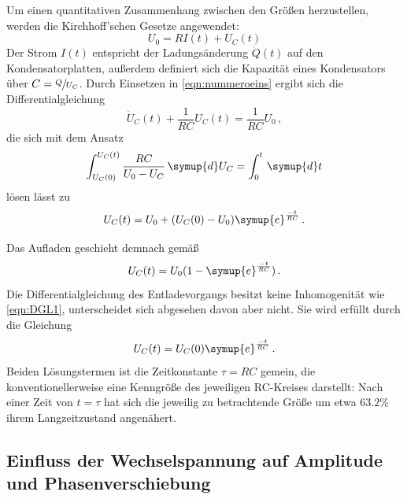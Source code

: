 Um einen quantitativen Zusammenhang zwischen den Größen herzustellen, werden die Kirchhoff'schen Gesetze angewendet: 
\begin{equation}
    U_0 = RI(t)+U_C(t)
    \label{eqn:nummeroeins}
\end{equation}
Der Strom $I(t)$ entspricht der Ladungsänderung $\dot{Q}(t)$ auf den Kondensatorplatten, außerdem definiert sich die 
Kapazität eines Kondensators über ${C=\sfrac{Q}{U_C}}$. 
Durch Einsetzen in \eqref{eqn:nummeroeins} ergibt sich die Differentialgleichung 
\begin{equation}
    \dot{U}_C(t) + \frac{1}{RC}U_C(t) = \frac{1}{RC}U_0\,,
    \label{eqn:DGL1}
\end{equation}
die sich mit dem Ansatz 
\begin{equation}
    \int_{U_C(0)}^{U_C(t)} \frac{RC}{U_0 - U_C} \, \symup{d} U_C = \int_0^t \, \symup{d}t
    \label{eqn:DGL1_solu}
\end{equation}
lösen lässt zu 
\begin{equation}
    U_C(t)=U_0 + (U_C(0)-U_0)\symup{e}^{\frac{-t}{RC}} \, . 
    \label{eqn:U_C_DC}
\end{equation}

Das Aufladen geschieht demnach gemäß
\begin{equation}
    U_C(t)=U_0(1-\symup{e}^{\frac{-t}{RC}})\, .
    \label{eqn:upload}
\end{equation}
Die Differentialgleichung des Entladevorgangs besitzt keine Inhomogenität wie \eqref{eqn:DGL1}, unterscheidet sich abgesehen 
davon aber nicht. 
Sie wird erfüllt durch die Gleichung 
\begin{equation}
    U_C(t)=U_C(0)\symup{e}^{\frac{-t}{RC}} \,.
    \label{eqn:download}
\end{equation}
Beiden Lösungstermen ist die Zeitkonstante ${\tau=RC}$ gemein, die konventionellerweise eine Kenngröße des jeweiligen 
RC-Kreises darstellt: Nach einer Zeit von ${t=\tau}$ hat sich die jeweilig zu betrachtende Größe um etwa $63.2\%$ ihrem Langzeitzustand 
angenähert. 
\FloatBarrier

\subsection{Einfluss der Wechselspannung auf Amplitude und Phasenverschiebung}

